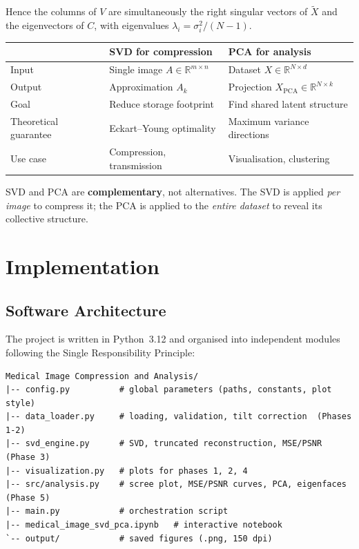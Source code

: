 \documentclass[11pt,a4paper]{article}
\theoremstyle{definition}
\begin{document}
Hence the columns of $V$ are simultaneously the right singular vectors of
$\tilde X$ and the eigenvectors of $C$, with eigenvalues
$\lambda_i = \sigma_i^2/(N-1)$.

\medskip
\begin{center}
\begin{tabularx}{0.9\textwidth}{lXX}
\toprule
& \textbf{SVD for compression} & \textbf{PCA for analysis} \\
\midrule
Input  & Single image $A \in \mathbb{R}^{m\times n}$ & Dataset $X \in \mathbb{R}^{N\times d}$ \\
Output & Approximation $A_k$ & Projection $X_\text{PCA} \in \mathbb{R}^{N\times k}$ \\
Goal   & Reduce storage footprint & Find shared latent structure \\
Theoretical guarantee & Eckart--Young optimality & Maximum variance directions \\
Use case & Compression, transmission & Visualisation, clustering \\
\bottomrule
\end{tabularx}
\end{center}

\medskip
\noindent SVD and PCA are \textbf{complementary}, not alternatives.
The SVD is applied \emph{per image} to compress it; the PCA is applied to the
\emph{entire dataset} to reveal its collective structure.


\section{Implementation}

\subsection{Software Architecture}

The project is written in Python~3.12 and organised into independent modules
following the Single Responsibility Principle:

\begin{lstlisting}[caption={Project structure}]
Medical Image Compression and Analysis/
|-- config.py          # global parameters (paths, constants, plot style)
|-- data_loader.py     # loading, validation, tilt correction  (Phases 1-2)
|-- svd_engine.py      # SVD, truncated reconstruction, MSE/PSNR (Phase 3)
|-- visualization.py   # plots for phases 1, 2, 4
|-- src/analysis.py    # scree plot, MSE/PSNR curves, PCA, eigenfaces (Phase 5)
|-- main.py            # orchestration script
|-- medical_image_svd_pca.ipynb   # interactive notebook
`-- output/            # saved figures (.png, 150 dpi)
\end{lstlisting}
\end{document}
